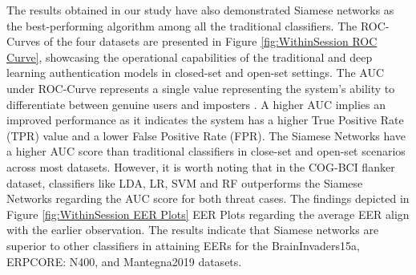 The results obtained in our study have also demonstrated Siamese networks as the best-performing algorithm among all the traditional classifiers. The ROC-Curves of the four datasets are presented in Figure \ref{fig:WithinSession ROC Curve}, showcasing the operational capabilities of the traditional and deep learning authentication models in closed-set and open-set settings. The AUC under ROC-Curve represents a single value representing the system's ability to differentiate between genuine users and imposters \cite{arias2023performance}. A higher AUC implies an improved performance as it indicates the system has a higher True Positive Rate (TPR) value and a lower False Positive Rate (FPR). The Siamese Networks have a higher AUC score than traditional classifiers in close-set and open-set scenarios across most datasets. However, it is worth noting that in the COG-BCI flanker dataset, classifiers like LDA, LR, SVM and RF outperforms the Siamese Networks regarding the AUC score for both threat cases. The findings depicted in Figure \ref{fig:WithinSession EER Plots} EER Plots regarding the average EER align with the earlier observation. The results indicate that Siamese networks are superior to other classifiers in attaining EERs for the BrainInvaders15a, ERPCORE: N400, and Mantegna2019 datasets. 
\smallskip


